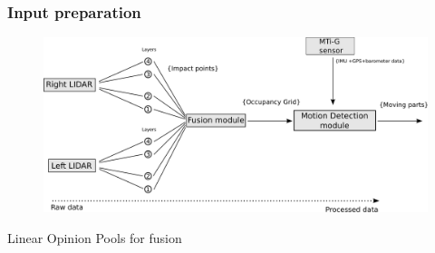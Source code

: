 \documentclass{beamer}
\begin{document}
	\begin{frame}
		\frametitle{Input preparation}
		\begin{figure}[h]
			\center
			\includegraphics[scale=0.18]{../img/fig:motion:framework}
		\end{figure}
		
		Linear Opinion Pools for fusion \cite{ADARVE-2012-671211}
	
	\end{frame}
\end{document}
